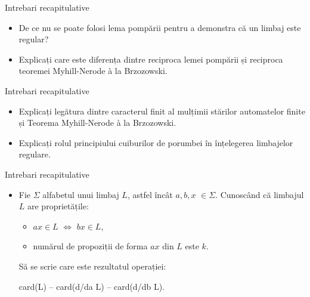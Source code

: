 \documentclass[pdf]{beamer}
\begin{document}
\begin{frame}{Intrebari recapitulative}
\begin{itemize}

\item
De ce nu se poate folosi lema pompării pentru a demonstra că un limbaj este regular?
\newline

\item
Explicați care este diferența dintre reciproca lemei pompării și reciproca teoremei Myhill-Nerode à la Brzozowski.
\newline

\end{itemize}
\end{frame}



\begin{frame}{Intrebari recapitulative}
\begin{itemize}

\item
Explicați legătura dintre caracterul finit al mulțimii stărilor automatelor finite și Teorema Myhill-Nerode à la Brzozowski.
\newline

\item
Explicați rolul principiului cuiburilor de porumbei în înțelegerea limbajelor regulare.
\newline

\end{itemize}
\end{frame}



\begin{frame}{Intrebari recapitulative}
\begin{itemize}
\item
Fie $\Sigma$ alfabetul unui limbaj $L$, astfel încât $a, b, x$ $\in \Sigma$. Cunoscând că limbajul $L$ are proprietățile:

\begin{itemize}
\item
$ax \in L$ $\Leftrightarrow$ $bx \in L$,

\item
numărul de propoziții de forma $ax$ din $L$ este $k$.
\end{itemize}

Să se scrie care este rezultatul operației: 

card(L) – card(d/da L) – card(d/db L).
\newline

\end{itemize}
\end{frame}
\end{document}
